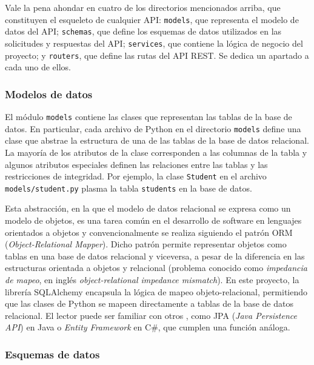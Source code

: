 Vale la pena ahondar en cuatro de los directorios mencionados arriba, que constituyen el esqueleto de cualquier \gls{API}: \texttt{models}, que representa el modelo de datos del \gls{API}; \texttt{schemas}, que define los esquemas de datos utilizados en las solicitudes y respuestas del \gls{API}; \texttt{services}, que contiene la lógica de negocio del proyecto; y \texttt{routers}, que define las rutas del \gls{API REST}. Se dedica un apartado a cada uno de ellos.

\subsubsection{Modelos de datos}

El módulo \texttt{models} contiene las clases que representan las tablas de la base de datos. En particular, cada archivo de \gls{Python} en el directorio \texttt{models} define una clase que abstrae la estructura de una de las tablas de la base de datos relacional. La mayoría de los atributos de la clase corresponden a las columnas de la tabla y algunos atributos especiales definen las relaciones entre las tablas y las restricciones de integridad. Por ejemplo, la clase \texttt{Student} en el archivo \texttt{models/student.py} plasma la tabla \texttt{students} en la base de datos.

Esta abstracción, en la que el modelo de datos relacional se expresa como un modelo de objetos, es una tarea común en el desarrollo de software en lenguajes orientados a objetos y convencionalmente se realiza siguiendo el patrón \gls{ORM} (\textit{Object-Relational Mapper}). Dicho patrón permite representar objetos como tablas en una base de datos relacional y viceversa, a pesar de la diferencia en las estructuras orientada a objetos y relacional (problema conocido como \textit{impedancia de mapeo}, en inglés \textit{object-relational impedance mismatch}). En este proyecto, la librería \gls{SQLAlchemy} encapsula la lógica de mapeo objeto-relacional, permitiendo que las clases de \gls{Python} se mapeen directamente a tablas de la base de datos relacional. El lector puede ser familiar con otros , como JPA (\textit{Java Persistence API}) en Java o \textit{Entity Framework} en C\#, que cumplen una función análoga.

\subsubsection{Esquemas de datos}
\label{subsec:schemas}

